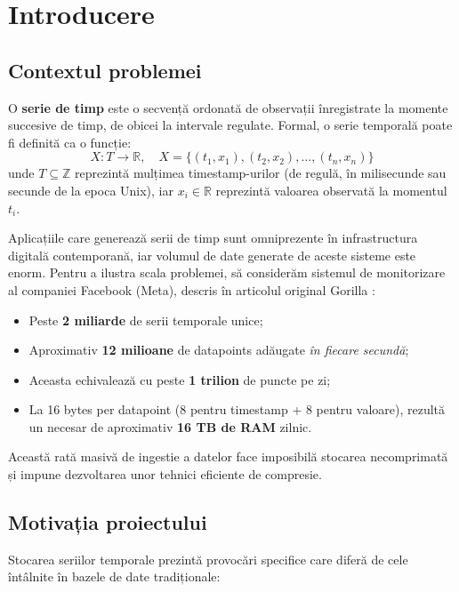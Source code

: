 \chapter{Introducere}

\section{Contextul problemei}

O \textbf{serie de timp} este o secvență ordonată de observații înregistrate la momente succesive de timp, de obicei la intervale regulate. Formal, o serie temporală poate fi definită ca o funcție:
\begin{equation}
    X: T \rightarrow \mathbb{R}, \quad X = \{(t_1, x_1), (t_2, x_2), \ldots, (t_n, x_n)\}
\end{equation}
unde $T \subseteq \mathbb{Z}$ reprezintă mulțimea timestamp-urilor (de regulă, în milisecunde sau secunde de la epoca Unix), iar $x_i \in \mathbb{R}$ reprezintă valoarea observată la momentul $t_i$.

Aplicațiile care generează serii de timp sunt omniprezente în infrastructura digitală contemporană, iar
volumul de date generate de aceste sisteme este enorm. Pentru a ilustra scala problemei, 
să considerăm sistemul de monitorizare al companiei Facebook (Meta), descris în articolul original Gorilla \cite{gorilla2015}:
\begin{itemize}
    \item Peste \textbf{2 miliarde} de serii temporale unice;
    \item Aproximativ \textbf{12 milioane} de datapoints adăugate \textit{în fiecare secundă};
    \item Aceasta echivalează cu peste \textbf{1 trilion} de puncte pe zi;
    \item La 16 bytes per datapoint (8 pentru timestamp + 8 pentru valoare), rezultă un necesar de aproximativ \textbf{16 TB de RAM} zilnic.
\end{itemize}

Această rată masivă de ingestie a datelor face imposibilă stocarea necomprimată și impune dezvoltarea unor tehnici eficiente de compresie.

\section{Motivația proiectului}

Stocarea seriilor temporale prezintă provocări specifice care diferă de cele întâlnite în bazele de date tradiționale:

